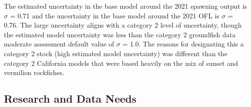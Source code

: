 \documentclass[11pt,
  english,
  a4paper,
]{article}
\begin{document}
The estimated uncertainty in the base model around the 2021 spawning output is {\(\sigma\)\leavevmode\tagmcend\tagstructend} = 0.71 and the uncertainty in the base model around the 2021 OFL is {\(\sigma\)\leavevmode\tagmcend\tagstructend} = 0.76. The large uncertainty aligns with a category 2 level of uncertainty, though the estimated model uncertainty was less than the category 2 groundfish data moderate assessment default value of {\(\sigma\)\leavevmode\tagmcend\tagstructend} = 1.0. The reasons for designating this a category 2 stock (high estimated model uncertainty) was different than the category 2 California models that were based heavily on the mix of sunset and vermilion rockfishes.

\leavevmode\tagmcend\tagstructend\par


\hypertarget{research-and-data-needs-1}{%
\subsection{Research and Data Needs}\label{research-and-data-needs-1}}

\leavevmode\tagmcend\tagstructend

\end{document}
